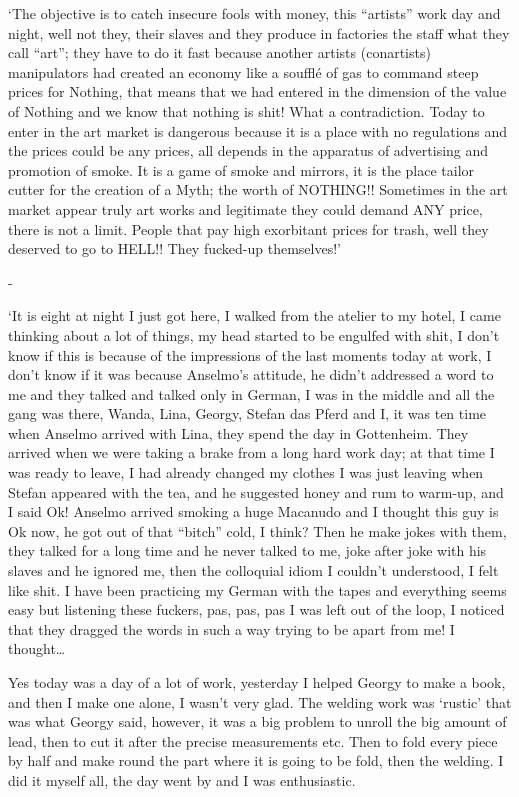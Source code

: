 \documentclass[smalldemyvopaper,11pt,twoside,onecolumn,openright,extrafontsizes]{memoir}
\begin{document}
‘The objective is to catch insecure fools with money, this “artists” work day and night, well not they, their slaves and they produce in factories the staff what they call “art”; they have to do it fast because another artists (conartists) manipulators had created an economy like a soufflé of gas to command steep prices for Nothing, that means that we had entered in the dimension of the value of Nothing and we know that nothing is shit! What a contradiction. Today to enter in the art market is dangerous because it is a place with no regulations and the prices could be any prices, all depends in the apparatus of advertising and promotion of smoke.  It is a game of smoke and mirrors, it is the place tailor cutter for the creation of a Myth; the worth of NOTHING!! Sometimes in the art market appear truly art works and legitimate they could demand ANY price, there is not a limit. People that pay high exorbitant prices for trash, well they deserved to go to HELL!! They fucked-up themselves!’ 

-

‘It is eight at night I just got here, I walked from the atelier to my hotel, I came thinking about a lot of things, my head started to be engulfed with shit, I don’t know if this is because of the impressions of the last moments today at work, I don’t know if it was because Anselmo’s attitude, he didn’t addressed a word to me and they talked and talked only in German, I was in the middle and all the gang was there, Wanda, Lina, Georgy, Stefan das Pferd and I, it was ten time when Anselmo arrived with Lina, they spend the day in Gottenheim. They arrived when we were taking a brake from a long hard work day; at that time I was ready to leave, I had already changed my clothes I was just leaving when Stefan appeared with the tea, and he suggested honey and rum to warm-up, and I said Ok! Anselmo arrived smoking a huge Macanudo and I thought this guy is Ok now, he got out of that “bitch” cold, I think? Then he make jokes with them, they talked for a long time and he never talked to me, joke after joke with his slaves and he ignored me, then the colloquial idiom I couldn’t understood, I felt like shit. I have been practicing my German with the tapes and everything seems easy but listening these fuckers, pas, pas, pas I was left out of the loop, I noticed that they dragged the words in such a way trying to be apart from me! I thought…

Yes today was a day of a lot of work, yesterday I helped Georgy to make a book, and then I make one alone, I wasn’t very glad. The welding work was ‘rustic’ that was what Georgy said, however, it was a big problem to unroll the big amount of lead, then to cut it after the precise measurements etc. Then to fold every piece by half and make round the part where it is going to be fold, then the welding. I did it myself all, the day went by and I was enthusiastic. 
\end{document}
